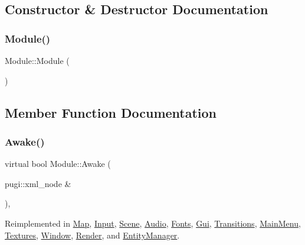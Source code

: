 \subsection{Constructor \& Destructor Documentation}
\mbox{\label{class_module_a5a240a8a9ab1813b17bcb810b24ceaea}} 
\subsubsection{\texorpdfstring{Module()}{Module()}}
{\footnotesize\ttfamily Module\+::\+Module (\begin{DoxyParamCaption}{ }\end{DoxyParamCaption})\hspace{0.3cm}{\ttfamily [inline]}}



\subsection{Member Function Documentation}
\mbox{\label{class_module_a4a283650cf8a73aa0b5599106bc2ba6c}} 
\subsubsection{\texorpdfstring{Awake()}{Awake()}}
{\footnotesize\ttfamily virtual bool Module\+::\+Awake (\begin{DoxyParamCaption}\item[{pugi\+::xml\+\_\+node \&}]{ }\end{DoxyParamCaption})\hspace{0.3cm}{\ttfamily [inline]}, {\ttfamily [virtual]}}



Reimplemented in \mbox{\hyperlink{class_map_a6b7219ea01063fe83b7fa13e196a17cd}{Map}}, \mbox{\hyperlink{class_input_a9876d33805a73bbb895eb453f5c492ec}{Input}}, \mbox{\hyperlink{class_scene_a03ed816e27ef7dced05082d214f554f1}{Scene}}, \mbox{\hyperlink{class_audio_a642fa346ae3e6658ad8c6b06c1da1f19}{Audio}}, \mbox{\hyperlink{class_fonts_aee8000727dca2b84dc46dacc35a9667b}{Fonts}}, \mbox{\hyperlink{class_gui_adcbbb73f8357c13664a1638857683e00}{Gui}}, \mbox{\hyperlink{class_transitions_a7280d32c9949be8e1211f945df187e15}{Transitions}}, \mbox{\hyperlink{class_main_menu_a0b45e9eb6945b2d26f54d708c24fb924}{Main\+Menu}}, \mbox{\hyperlink{class_textures_a3956f023ff27addfed10285805ee7f61}{Textures}}, \mbox{\hyperlink{class_window_a0b02015257037d885d85afb77d0a3605}{Window}}, \mbox{\hyperlink{class_render_a8a61f512aafe184f4d322433e5f695a4}{Render}}, and \mbox{\hyperlink{class_entity_manager_ada35a7fdb9b3bbaaee41a9451c94c1f9}{Entity\+Manager}}.

